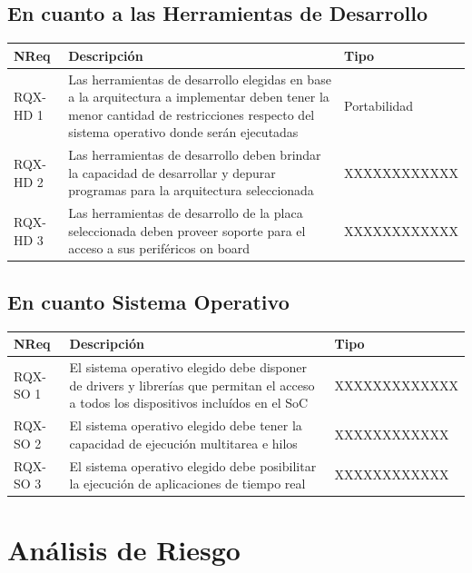 		\subsection{En cuanto a las Herramientas de Desarrollo}
		\begin{tabular}{ p{2.5cm} p{8cm} p{3cm} }
		\hline 
		\rowcolor[gray]{0.8} N\textordmasculine Req & Descripción  & Tipo\\
		\hline 
		RQX-HD 1 &  Las herramientas de desarrollo elegidas en base a la arquitectura a implementar deben tener la menor cantidad de restricciones respecto
		del sistema operativo donde serán ejecutadas & Portabilidad\\
		\hline 
		RQX-HD 2 &  Las herramientas de desarrollo deben brindar la capacidad de desarrollar y depurar programas para la arquitectura seleccionada &
		XXXXXXXXXXXX\\ %
		\hline
		RQX-HD 3 &  Las herramientas de desarrollo de la placa seleccionada deben proveer soporte para el acceso a sus periféricos on board &
		XXXXXXXXXXXX\\ %
		\hline 
		\end{tabular}
		
		\subsection{En cuanto Sistema Operativo} 	 
		\begin{tabular}{ p{2.5cm} p{8cm} p{3cm} }
		\hline 
		\rowcolor[gray]{0.8} N\textordmasculine Req & Descripción  & Tipo\\
		\hline 
		RQX-SO 1 &  El sistema operativo elegido debe disponer de drivers y librerías que permitan el acceso a todos los dispositivos incluídos en el SoC &
		XXXXXXXXXXXXX\\ %
		\hline 
		RQX-SO 2 &  El sistema operativo elegido debe tener la capacidad de ejecución multitarea e hilos & XXXXXXXXXXXX\\ %
		\hline
		RQX-SO 3 &  El sistema operativo elegido debe posibilitar la ejecución de aplicaciones de tiempo real & XXXXXXXXXXXX\\ %
		\hline 
		\end{tabular}
	
	\section{Análisis de Riesgo}

